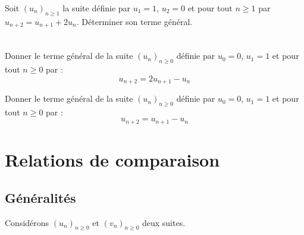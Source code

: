 \documentclass[a4paper,10pt]{report}
\begin{document}
\begin{ex} Soit $(u_n)_{n \geq 1}$ la suite définie par $u_1 = 1$, $u_2 = 0$ et pour tout $n \geq 1$ par $u_{n+2}= u_{n+1} + 2 u_n$. Déterminer son terme général.

%
%
%
%
%

\vspace{11cm}
\end{ex}

\newpage

$\phantom{test}$

\vspace{4cm}

\begin{exa} Donner le terme général de la suite $(u_n)_{n \geq 0}$ définie par $u_0=0$, $u_1=1$ et pour tout $n \geq 0$ par :  $$u_{n+2} = 2 u_{n+1}-u_n$$
\end{exa}

\begin{exa} Donner le terme général de la suite $(u_n)_{n \geq 0}$ définie par $u_0=0$, $u_1=1$ et pour tout $n \geq 0$ par : $$ u_{n+2} =  u_{n+1} - u_n$$ \end{exa}


\section{Relations de comparaison}
\subsection{Généralités}
\noindent Considérons $(u_n)_{n \geq 0}$ et $(v_n)_{n \geq 0}$ deux suites.
\end{document}
